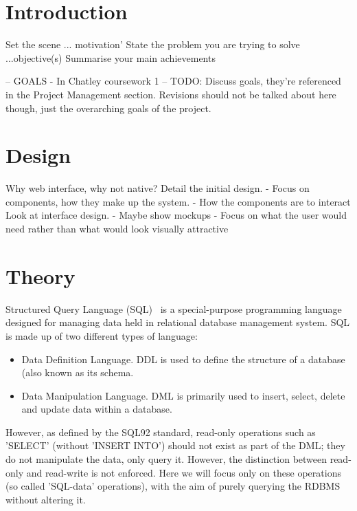 \documentclass[a4wide, 11pt]{article}
\begin{document}
\section{Introduction}

        Set the scene ... motivation'
        State the problem you are trying to solve ...objective(s)
        Summarise your main achievements 

        -- GOALS - In Chatley coursework 1 --
        TODO: Discuss goals, they're referenced in the Project Management
        section. Revisions should not be talked about here though, just the
        overarching goals of the project.

\section{Design}

        Why web interface, why not native?
        Detail the initial design.
          - Focus on components, how they make up the system.
          - How the components are to interact
        Look at interface design.
          - Maybe show mockups
          - Focus on what the user would need rather than what would look
            visually attractive

\section{Theory}

Structured Query Language (SQL)~\cite{wiki:SQL} is a special-purpose
programming language designed for managing data held in relational database
management system. SQL is made up of two different types of language:

\begin{itemize}

    \item
      Data Definition Language. DDL is used to define the structure of a
      database (also known as its schema.
    \item 
      Data Manipulation Language. DML is primarily used to insert, select,
      delete and update data within a database.

\end{itemize}

However, as defined by the SQL92 standard\cite{isoSQL}, read-only operations such as
'SELECT' (without 'INSERT INTO') should not exist as part of the DML; they do
not manipulate the data, only query it. However, the distinction between
read-only and read-write is not enforced. Here we will focus only on these
operations (so called 'SQL-data' operations), with the aim of purely querying
the RDBMS without altering it.
\end{document}
